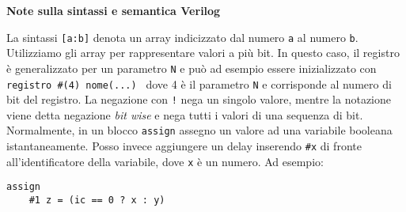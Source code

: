 \begin{note}
	\textbf{Note sulla sintassi e semantica Verilog}
	
	La sintassi \texttt{[a:b]} denota un array indicizzato dal numero \texttt{a}
	al numero \texttt{b}. Utilizziamo gli array per rappresentare valori a più
	bit. In questo caso, il registro è generalizzato per un parametro \texttt{N}
	e può ad esempio essere inizializzato con \texttt{registro \#(4) nome(...) }
	dove 4 è il parametro \texttt{N} e corrisponde al numero di bit del
	registro. La negazione con \texttt{!} nega un singolo valore, mentre la
	notazione \texttt{~} viene detta negazione \textit{bit wise} e nega tutti i
	valori di una sequenza di bit. Normalmente, in un blocco \texttt{assign}
	assegno un valore ad una variabile booleana istantaneamente. Posso invece
	aggiungere un delay inserendo \texttt{\#x} di fronte all'identificatore
	della variabile, dove \texttt{x} è un numero. Ad esempio:
\begin{lstlisting}[style={verilog}]
assign
	#1 z = (ic == 0 ? x : y)
\end{lstlisting}
\end{note}

\FloatBarrier

